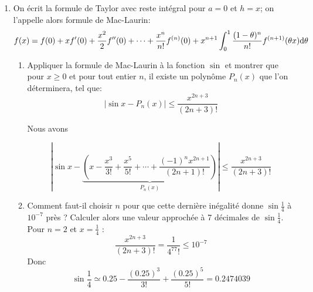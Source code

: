 \documentclass{article}[11pt]
\def \de {{\rm d}}
\begin{document}
\begin{enumerate}
\begin{enumerate}
\end{enumerate}

\item  On écrit la formule de Taylor avec reste intégral pour $a=0$ et $h=x$; on l'appelle alors formule de Mac-Laurin:
\[f(x)=f(0)+xf'(0)+\frac{x^2}{2}f''(0)+\cdots+\frac{x^n}{n!}f^{(n)}(0)+x^{n+1}\int_0^1\frac{(1-\theta)^n}{n!}f^{(n+1)}(\theta x)\de \theta\]
\begin{enumerate}
\item Appliquer la formule de Mac-Laurin à la fonction $\sin$ et montrer que pour  $x\geq 0$ et pour tout entier $n$, il existe un polynôme $P_n(x)$ que l'on déterminera, tel que:
\[|\sin x - P_n(x)|\leq \frac{x^{2n+3}}{(2n+3)!}\]

\color{black}
Nous avons

\[\left\vert \sin x -\underbrace{\left(x-\frac{x^3}{3!}+\frac{x^5}{5!}+\cdots + \frac{(-1)^nx^{2n+1}}{(2n+1)!}\right)}_{P_n(x)}\right\vert \leq \frac{ x^{2n+3}}{(2n+3)!}\]
\color{blue}
\item Comment faut-il choisir $n$ pour que cette dernière inégalité donne $\sin \frac 14$ à $10^{-7}$ près ? Calculer alors une valeur approchée à 7 décimales de $\sin \frac 14$.
\color{black}
Pour $n=2$ et $x=\frac 14$  :
\[\frac{ x^{2n+3}}{(2n+3)!}=\frac{1}{4^77!}\leq 10^{-7}\]
Donc
\[\sin \frac 14 \simeq 0.25-\frac{(0.25)^3}{3!}+\frac{(0.25)^5}{5!}=0.2474039\]
\end{enumerate}
\end{enumerate}
\end{document}
